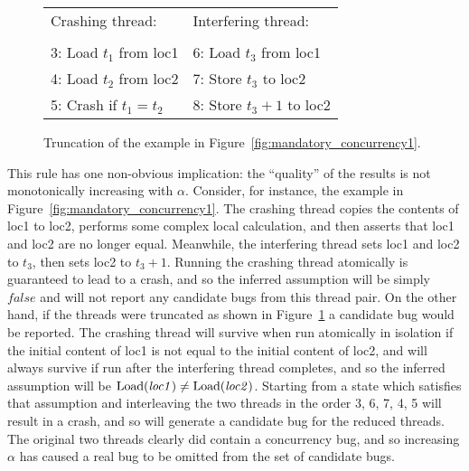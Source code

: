 \begin{figure}
\begin{centering}
\hfill
\begin{tabular}{p{8cm}l}
Crashing thread:          & Interfering thread: \\
\\
3: Load $t_1$ from loc1   & 6: Load $t_3$ from loc1 \\
4: Load $t_2$ from loc2   & 7: Store $t_3$ to loc2 \\
5: Crash if $t_1 = t_2$   & 8: Store $t_3 + 1$ to loc2
\end{tabular}
\hfill
\end{centering}
\caption{Truncation of the example in Figure~\ref{fig:mandatory_concurrency1}.}
\label{fig:mandatory_concurrency2}
\end{figure}


This rule has one non-obvious implication: the ``quality'' of the
results is not monotonically increasing with $\alpha$.  Consider, for
instance, the example in
Figure~\ref{fig:mandatory_concurrency1}.  The crashing thread copies the contents of loc1 to loc2,
performs some complex local calculation, and then asserts that loc1
and loc2 are no longer equal.  Meanwhile, the interfering thread sets
loc1 and loc2 to $t_3$, then sets loc2 to $t_3 + 1$.  Running the
crashing thread atomically is guaranteed to lead to a crash, and so
the inferred assumption will be simply $\mathit{false}$ and
{\technique} will not report any candidate bugs from this thread pair.
On the other hand, if the threads were truncated as shown in
Figure~\ref{fig:mandatory_concurrency2} a candidate bug would be
reported.  The crashing thread will survive when run atomically in
isolation if the initial content of loc1 is not equal to the initial
content of loc2, and will always survive if run after the interfering
thread completes, and so the inferred assumption will be
$\mathrm{Load}(\mathit{loc1}) \not= \mathrm{Load}(\mathit{loc2})$.  Starting from
a state which satisfies that assumption and interleaving the two
threads in the order 3, 6, 7, 4, 5 will result in
a crash, and so {\technique} will generate a candidate bug for the
reduced threads.  The original two threads clearly did contain a
concurrency bug, and so increasing $\alpha$ has caused a real bug to
be omitted from the set of candidate bugs.

